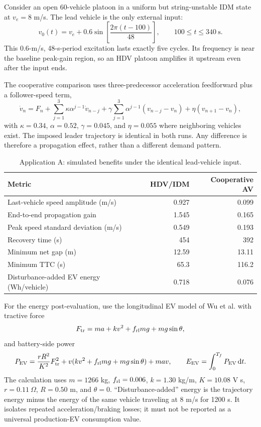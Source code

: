 \documentclass[11pt,a4paper,openany]{book}
\numberwithin{equation}{chapter}
\numberwithin{figure}{chapter}
\numberwithin{table}{chapter}
\newcommand{\dd}{\,\mathrm{d}}
\begin{document}
Consider an open 60-vehicle platoon in a uniform but string-unstable IDM state at $v_e=8$ m/s. The lead vehicle is the only external input:
\begin{equation}
v_0(t)=v_e+0.6\sin\!\left[\frac{2\pi(t-100)}{48}\right],\qquad100\le t\le340\ \mathrm{s}.
\label{eq:application-leader-sine}
\end{equation}
This 0.6-m/s, 48-s-period excitation lasts exactly five cycles. Its frequency is near the baseline peak-gain region, so an HDV platoon amplifies it upstream even after the input ends.

The cooperative comparison uses three-predecessor acceleration feedforward plus a follower-speed term,
\begin{equation}
\dot v_n=F_n+\sum_{j=1}^{3}\kappa\alpha^{j-1}\dot v_{n-j}
+\gamma\sum_{j=1}^{3}\alpha^{j-1}(v_{n-j}-v_n)+\eta(v_{n+1}-v_n),
\label{eq:application-cooperative-av}
\end{equation}
with $\kappa=0.34$, $\alpha=0.52$, $\gamma=0.045$, and $\eta=0.055$ where neighboring vehicles exist. The imposed leader trajectory is identical in both runs. Any difference is therefore a propagation effect, rather than a different demand pattern.

\begin{table}[htbp]\centering
\caption{Application A: simulated benefits under the identical lead-vehicle input.}\label{tab:application-av-benefits}
\begin{tabular}{lrr}\toprule
Metric & HDV/IDM & Cooperative AV\\\midrule
Last-vehicle speed amplitude (m/s) & 0.927 & 0.099\\
End-to-end propagation gain & 1.545 & 0.165\\
Peak speed standard deviation (m/s) & 0.549 & 0.193\\
Recovery time (s) & 454 & 392\\
Minimum net gap (m) & 12.59 & 13.11\\
Minimum TTC (s) & 65.3 & 116.2\\
Disturbance-added EV energy (Wh/vehicle) & 0.718 & 0.076\\\bottomrule
\end{tabular}\end{table}

For the energy post-evaluation, use the longitudinal EV model of Wu et al. \cite{wu2015} with tractive force
\begin{equation}
F_{\rm tr}=ma+kv^2+f_{\rm rl}mg+mg\sin\theta,
\end{equation}
and battery-side power
\begin{equation}
P_{\rm EV}=\frac{rR^2}{K^2}F_{\rm tr}^2+v(kv^2+f_{\rm rl}mg+mg\sin\theta)+mav,
\qquad E_{\rm EV}=\int_0^{T_f}P_{\rm EV}\dd t.
\label{eq:wu-ev-power}
\end{equation}
The calculation uses $m=1266$ kg, $f_{\rm rl}=0.006$, $k=1.30$ kg/m, $K=10.08$ V s, $r=0.11\ \Omega$, $R=0.50$ m, and $\theta=0$. ``Disturbance-added'' energy is the trajectory energy minus the energy of the same vehicle traveling at 8 m/s for 1200 s. It isolates repeated acceleration/braking losses; it must not be reported as a universal production-EV consumption value.
\end{document}

